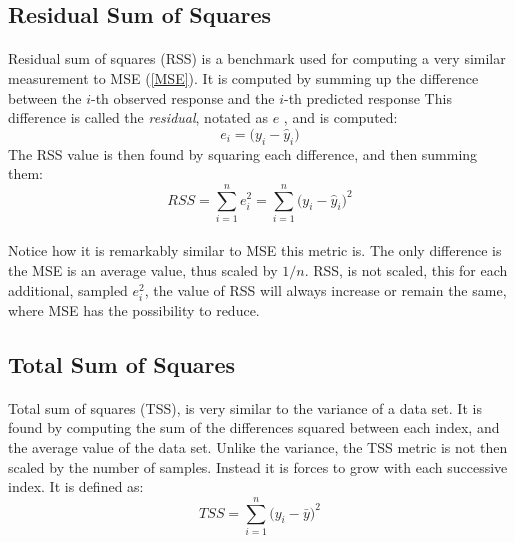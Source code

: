 \documentclass[12pt,letterpaper]{article}
\begin{document}

\subsection{Residual Sum of Squares}
\paragraph*{}Residual sum of squares (RSS) is a benchmark used for computing a very similar measurement to MSE (\ref{MSE}). It is computed by summing up the difference between the $i$-th observed response and the $i$-th predicted response This difference is called the \textit{residual}, notated as $e$ \cite{James}, and is computed:
\begin{equation}
\label{residual}
e_i = \big(y_i - \hat{y}_i \big)
\end{equation}
The RSS value is then found by squaring each difference, and then summing them:
\begin{equation}
\label{RSS}
RSS = \sum_{i=1}^{n} e_i^2 = \sum_{i=1}^n \big(y_i - \hat{y}_i \big)^2
\end{equation}
\paragraph*{}Notice how it is remarkably similar to MSE this metric is. The only difference is the MSE is an average value, thus scaled by $1/n$. RSS, is not scaled, this for each additional, sampled $e_i^2$, the value of RSS will always increase or remain the same, where MSE has the possibility to reduce.


\subsection{Total Sum of Squares}
\paragraph*{}Total sum of squares (TSS), is very similar to the variance of a data set. It is found by computing the sum of the differences squared between each index, and the average value of the data set. Unlike the variance, the TSS metric is not then scaled by the number of samples. Instead it is forces to grow with each successive index. It is defined as:
\begin{equation}
\label{TSS}
TSS = \sum_{i=1}^n \big(y_i - \bar{y}\big)^2
\end{equation}
\end{document}
